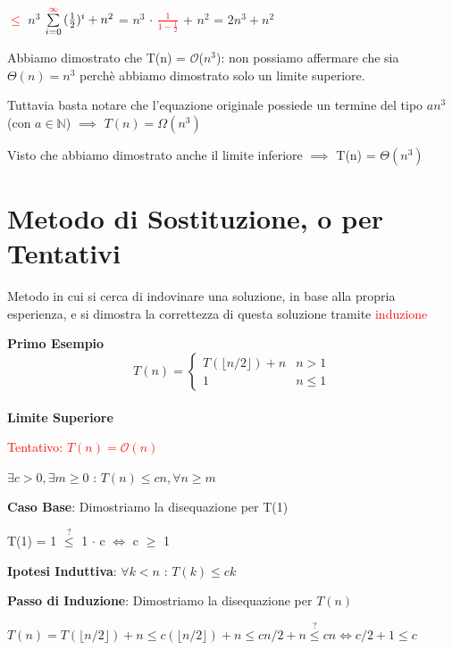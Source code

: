 \documentclass[../cheatSheetAlgoritmi.tex]{subfiles}
\begin{document}
\bigskip

\textcolor{red}{$\leq$} $n^{3}$ $\sum\limits_{i=0}^{\textcolor{red}{\infty}} {(\frac{1}{2})^{i}} + n^{2}$ =
$n^{3}$ $\cdot$ \textcolor{red}{$\frac{1}{1-\frac{1}{2}}$} + $n^{2}$ = $2n^{3} + n^2$
\newpage
\begin{flushleft}
Abbiamo dimostrato che T(n) = $\mathcal{O}$($n^{3}$): non possiamo affermare che sia $\Theta(n) = n^{3}$ perchè abbiamo dimostrato solo un limite superiore.
\end{flushleft}
Tuttavia basta notare che l'equazione originale possiede un termine del tipo $an^{3}$ (con $a \in \mathbb{N}$) $\implies$ $T(n) = \Omega(n^{3})$

Visto che abbiamo dimostrato anche il limite inferiore $\implies$ T(n) = $\Theta(n^{3})$ 

\section{Metodo di Sostituzione, o per Tentativi}
Metodo in cui si cerca di indovinare una soluzione, in base alla propria esperienza, e si dimostra la correttezza di questa soluzione tramite \textcolor{red}{induzione}

\bigskip

\textbf{Primo Esempio}
	\begin{equation*}
  		T(n)=\begin{cases}
    		T(\lfloor n/2 \rfloor) + n & \text{$n > 1$}\\
    		1 & \text{$n \leq 1$}
  		\end{cases}
	\end{equation*}
\hfill\\
\textbf{Limite Superiore}

\textcolor{red}{Tentativo: $T(n) = \mathcal{O}(n)$}

$\exists c > 0, \exists m \geq 0$ : $T(n) \leq cn, \forall n \geq m$

\bigskip

\textbf{Caso Base}: Dimostriamo la disequazione per T(1)

T(1) = 1 $\stackrel{?}{\leq}$ 1 $\cdot$ c $\iff$ c $\geq$ 1

\bigskip

\textbf{Ipotesi Induttiva}: $\forall k < n$ : $T(k) \leq ck$

\textbf{Passo di Induzione}: Dimostriamo la disequazione per $T(n)$

$T(n) =  T(\lfloor n/2 \rfloor) + n \leq c( \lfloor n/2 \rfloor) + n \leq cn/2 + n \stackrel{?}{\leq} cn \iff  c/2 + 1 \leq c$
\end{document}
